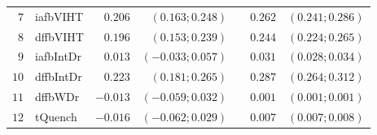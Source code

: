 \begin{table*}[htp]
\begin{tabular*}{\textwidth}{@{}rlrrrrr@{}}
\footnotesize{$7 $} & \footnotesize{iafbVIHT } & \footnotesize{$0.206$}   & \footnotesize{$(0.163;0.248)$}  && \footnotesize{$0.262$} & \footnotesize{$(0.241;0.286)$} \\
\footnotesize{$8 $} & \footnotesize{dffbVIHT } & \footnotesize{$0.196$}   & \footnotesize{$(0.153;0.239)$}  && \footnotesize{$0.244$} & \footnotesize{$(0.224;0.265)$} \\
\footnotesize{$9 $} & \footnotesize{iafbIntDr} & \footnotesize{$0.013$}   & \footnotesize{$(-0.033;0.057)$} && \footnotesize{$0.031$} & \footnotesize{$(0.028;0.034)$} \\
\footnotesize{$10$} & \footnotesize{dffbIntDr} & \footnotesize{$0.223$}   & \footnotesize{$(0.181;0.265)$}  && \footnotesize{$0.287$} & \footnotesize{$(0.264;0.312)$} \\
\footnotesize{$11$} & \footnotesize{dffbWDr  } & \footnotesize{$-0.013$}  & \footnotesize{$(-0.059;0.032)$} && \footnotesize{$0.001$} & \footnotesize{$(0.001;0.001)$} \\
\footnotesize{$12$} & \footnotesize{tQuench  } & \footnotesize{$-0.016$}  & \footnotesize{$(-0.062;0.029)$} && \footnotesize{$0.007$} & \footnotesize{$(0.007;0.008)$} \\

\bottomrule
\end{tabular*}
\end{table*}

